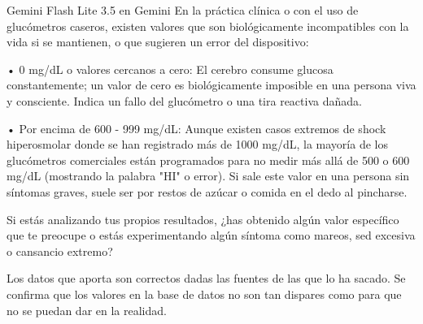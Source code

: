 \documentclass[12pt,a4paper,oneside]{book}
\begin{document}
\begin{iaresp}{Gemini Flash Lite 3.5 en Gemini}
En la práctica clínica o con el uso de glucómetros caseros, existen valores que son biológicamente incompatibles con la vida si se mantienen, o que sugieren un error del dispositivo:

• 0 mg/dL o valores cercanos a cero: El cerebro consume glucosa constantemente; un valor de cero es biológicamente imposible en una persona viva y consciente. Indica un fallo del glucómetro o una tira reactiva dañada.

• Por encima de 600 - 999 mg/dL: Aunque existen casos extremos de shock hiperosmolar donde se han registrado más de 1000 mg/dL, la mayoría de los glucómetros comerciales están programados para no medir más allá de 500 o 600 mg/dL (mostrando la palabra "HI" o error). Si sale este valor en una persona sin síntomas graves, suele ser por restos de azúcar o comida en el dedo al pincharse.

Si estás analizando tus propios resultados, ¿has obtenido algún valor específico que te preocupe o estás experimentando algún síntoma como mareos, sed excesiva o cansancio extremo?
\end{iaresp}
\begin{iaanalisis}
Los datos que aporta son correctos dadas las fuentes de las que lo ha sacado. Se confirma que los valores en la base de datos no son tan dispares como para que no se puedan dar en la realidad.
\end{iaanalisis}
\end{document}
